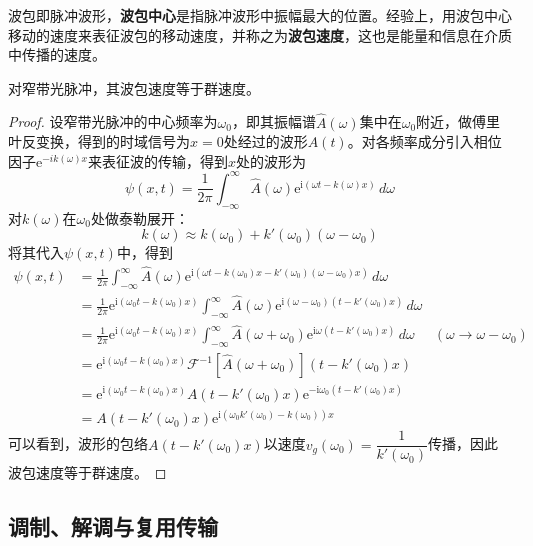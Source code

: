 \begin{definition}
    波包即脉冲波形，\textbf{波包中心}是指脉冲波形中振幅最大的位置。经验上，用波包中心移动的速度来表征波包的移动速度，并称之为\textbf{波包速度}，这也是能量和信息在介质中传播的速度。
\end{definition}
\begin{proposition}
    对窄带光脉冲，其波包速度等于群速度。
\end{proposition}
\begin{proof}
设窄带光脉冲的中心频率为$\omega_0$，即其振幅谱$\hat{A}(\omega)$集中在$\omega_0$附近，做傅里叶反变换，得到的时域信号为$x=0$处经过的波形$A(t)$。对各频率成分引入相位因子$\mathrm{e}^{-ik(\omega)x}$来表征波的传输，得到$x$处的波形为
\[\psi(x,t)=\frac{1}{2\pi}\int_{-\infty}^{\infty}\hat{A}(\omega)\mathrm{e}^{\mathrm{i}(\omega t-k(\omega)x)}\,d\omega\]
对$k(\omega)$在$\omega_0$处做泰勒展开：
\[k(\omega)\approx k(\omega_0)+k'(\omega_0)(\omega-\omega_0)\]
将其代入$\psi(x,t)$中，得到
\begin{align*}
    \psi(x,t)&=\frac{1}{2\pi}\int_{-\infty}^{\infty}\hat{A}(\omega)\mathrm{e}^{\mathrm{i}(\omega t-k(\omega_0)x-k'(\omega_0)(\omega-\omega_0)x)}\,d\omega\\
    &=\frac{1}{2\pi}\mathrm{e}^{\mathrm{i}(\omega_0 t-k(\omega_0)x)}\int_{-\infty}^{\infty}\hat{A}(\omega)\mathrm{e}^{\mathrm{i}(\omega - \omega_0)(t - k'(\omega_0)x)}\,d\omega\\
    &=\frac{1}{2\pi}\mathrm{e}^{\mathrm{i}(\omega_0 t-k(\omega_0)x)}\int_{-\infty}^{\infty}\hat{A}(\omega+\omega_0)\mathrm{e}^{\mathrm{i}\omega(t - k'(\omega_0)x)}\,d\omega&(\omega\to\omega-\omega_0)\\
    &=\mathrm{e}^{\mathrm{i}(\omega_0 t-k(\omega_0)x)}\mathcal{F}^{-1}[\hat{A}(\omega+\omega_0)]\left(t - k'(\omega_0)x\right)\\
    &=\mathrm{e}^{\mathrm{i}(\omega_0 t-k(\omega_0)x)}A\left(t - k'(\omega_0)x\right)\mathrm{e}^{-\mathrm{i}\omega_0 (t- k'(\omega_0)x)}\\
    &=A\left(t - k'(\omega_0)x\right)\mathrm{e}^{\mathrm{i}(\omega_0 k'(\omega_0)-k(\omega_0))x}
\end{align*}
可以看到，波形的包络$A\left(t - k'(\omega_0)x\right)$以速度$v_g(\omega_0)=\dfrac{1}{k'(\omega_0)}$传播，因此波包速度等于群速度。
\end{proof}

\subsection{调制、解调与复用传输}\label{sub:modulation}

